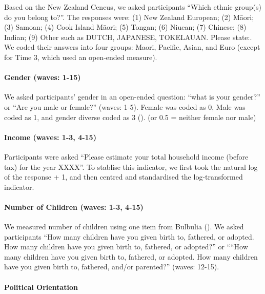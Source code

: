 \documentclass[
  singlecolumn]{article}
\let\oldparagraph\paragraph
\renewcommand{\paragraph}[1]{\oldparagraph{#1}\mbox{}}
\begin{document}
Based on the New Zealand Cencus, we asked participants ``Which ethnic
group(s) do you belong to?''. The responses were: (1) New Zealand
European; (2) Māori; (3) Samoan; (4) Cook Island Māori; (5) Tongan; (6)
Niuean; (7) Chinese; (8) Indian; (9) Other such as DUTCH, JAPANESE,
TOKELAUAN. Please state:. We coded their answers into four groups:
Maori, Pacific, Asian, and Euro (except for Time 3, which used an
open-ended measure).

\paragraph{Gender (waves: 1-15)}\label{gender-waves-1-15}

We asked participants' gender in an open-ended question: ``what is your
gender?'' or ``Are you male or female?'' (waves: 1-5). Female was coded
as 0, Male was coded as 1, and gender diverse coded as 3
(). (or 0.5
= neither female nor male)

\paragraph{Income (waves: 1-3, 4-15)}\label{income-waves-1-3-4-15}

Participants were asked ``Please estimate your total household income
(before tax) for the year XXXX''. To stablise this indicator, we first
took the natural log of the response + 1, and then centred and
standardised the log-transformed indicator.

\paragraph{Number of Children (waves: 1-3,
4-15)}\label{number-of-children-waves-1-3-4-15}

We measured number of children using one item from Bulbulia
(). We asked participants ``How many
children have you given birth to, fathered, or adopted. How many
children have you given birth to, fathered, or adopted?'' or ````How
many children have you given birth to, fathered, or adopted. How many
children have you given birth to, fathered, and/or parented?'' (waves:
12-15).

\paragraph{Political Orientation}\label{political-orientation}
\end{document}
